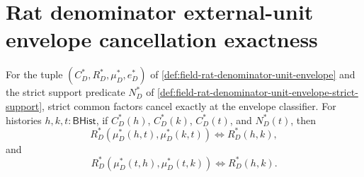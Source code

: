 \section{Rat denominator external-unit envelope cancellation exactness}
\label{sec:field-rat-denominator-unit-envelope-cancellation-exactness}

\begin{theorem}
\label{thm:field-rat-denominator-unit-envelope-cancellation-exactness}
For the tuple $(C_D^\ast,R_D^\ast,\mu_D^\ast,e_D^\ast)$ of
\autoref{def:field-rat-denominator-unit-envelope} and the strict support
predicate $N_D^\ast$ of
\autoref{def:field-rat-denominator-unit-envelope-strict-support}, strict
common factors cancel exactly at the envelope classifier. For histories
$h,k,t:\mathsf{BHist}$, if $C_D^\ast(h)$, $C_D^\ast(k)$, $C_D^\ast(t)$, and
$N_D^\ast(t)$, then
$$
R_D^\ast(\mu_D^\ast(h,t),\mu_D^\ast(k,t))
\Longleftrightarrow R_D^\ast(h,k),
$$
and
$$
R_D^\ast(\mu_D^\ast(t,h),\mu_D^\ast(t,k))
\Longleftrightarrow R_D^\ast(h,k).
$$
\end{theorem}
